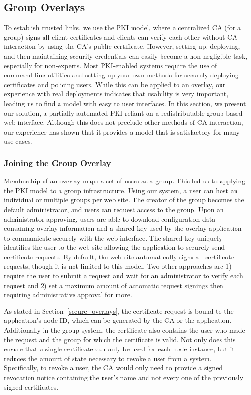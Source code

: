 \documentclass[conference]{IEEEtran}
\begin{document}
\subsection{Group Overlays}
\label{group_overlays}
To establish trusted links, we use the PKI model, where a centralized CA (for a group) signs
all client certificates and clients can verify each other without CA interaction
by using the CA's public certificate.  However, setting up, deploying, and then
maintaining security credentials can easily become a non-negligible task,
especially for non-experts.  Most PKI-enabled systems require the use of
command-line utilities and setting up your own methods for securely
deploying certificates and policing users.  While this can be applied to an
overlay, our experience with real deployments indicates that usability is very
important, leading us to find a model with easy to user interfaces.
In this section, we present our solution, a partially automated PKI reliant on
a redistributable group based web interface.  Although this does not preclude
other methods of CA interaction, our experience has shown that it provides a
model that is satisfactory for many use cases.

\subsubsection{Joining the Group Overlay}
Membership of an overlay maps a set of users as a group. This led us to applying
the PKI model to a group infrastructure.  Using our
system, a user can host an individual or multiple groups per web site.  The
creator of the group becomes the default administrator, and users can request
access to the group.  Upon an administrator approving, users are able to
download configuration data containing overlay information and a shared key
used by the overlay application to communicate securely with the web interface.
The shared key uniquely identifies the user to the web site allowing the
application to securely send certificate requests.  By default, the web site
automatically signs all certificate requests, though it is not limited to this
model.  Two other approaches are 1) require the user to submit a request and
wait for an administrator to verify each request and 2) set a maximum amount
of automatic request signings then requiring administrative approval for more.

As stated in Section~\ref{secure_overlays}, the certificate request is bound
to the application's node ID, which can be generated by the CA or the
application.  Additionally in the group system, the certificate also contains
the user who made the request and the group for which the certificate is valid.
Not only does this ensure that a single certificate can only be used for each
node instance, but it reduces the amount of state necessary to revoke a user
from a system.  Specifically, to revoke a user, the CA would only need to
provide a signed revocation notice containing the user's name and not every one
of the previously signed certificates.
\end{document}
